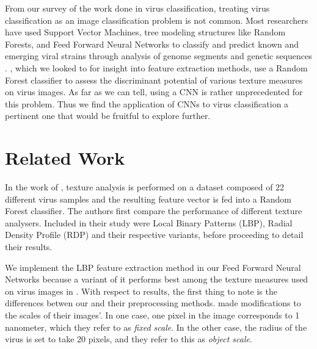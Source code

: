 \begin{multicols}{2}
From our survey of the work done in virus classification, treating virus classification as an image classification problem is not common. Most researchers have used Support Vector Machines, tree modeling structures like Random Forests, and Feed Forward Neural Networks to classify and predict known and emerging viral strains through analysis of genome segments and genetic sequences \citet{work_A} \citet{work_B} \citet{work_C}. \citet{kylberg2011virus}, which we looked to for insight into feature extraction methods, use a Random Forest classifier to assess the discriminant potential of various texture measures on virus images. As far as we can tell, using a CNN is rather unprecedented for this problem. Thus we find the application of CNNs to virus classification a pertinent one that would be fruitful to explore further.


\section{Related Work}
\label{text:relwork_results}
In the work of \citet{kylberg2011virus}, texture analysis is performed on a dataset composed of 22 different  virus samples and the resulting feature vector is fed into a Random Forest classifier. The authors first compare the performance of different texture analysers. Included in their study were Local Binary Patterns (LBP), Radial Density Profile (RDP) and their respective variants, before proceeding to detail their results. 

We implement the LBP feature extraction method in our Feed Forward Neural Networks because a variant of it performs best among the texture measures used on virus images in \citet{kylberg2011virus}. With respect to \citet{kylberg2011virus} results, the first thing to note is the differences betwen our and their preprocessing methods. \citet{kylberg2011virus} made modifications to the scales of their images'. In one case, one pixel in the image corresponds to 1 nanometer, which they refer to as \emph{fixed scale}. In the other case, the radius of the virus is set to take 20 pixels, and they refer to this as \emph{object scale}. 


\end{multicols}

